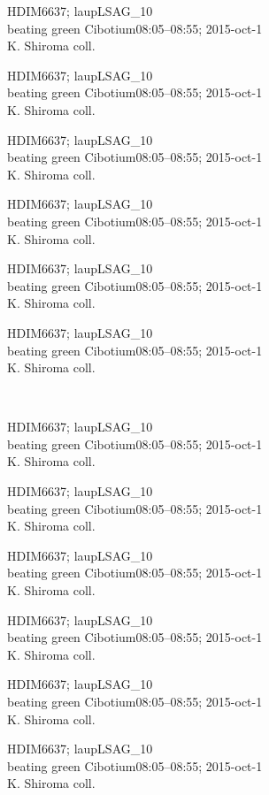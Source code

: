 \documentclass[2pt]{extarticle}
\begin{document}
\noindent
\parbox{0.16\textwidth}{\tiny \raggedright \rule[-0.3\baselineskip]{0pt}{10pt}HDIM6637; laupLSAG\_10\\ beating green Cibotium08:05--08:55; 2015-oct-1\\ K. Shiroma coll.}
\parbox{0.16\textwidth}{\tiny \raggedright \rule[-0.3\baselineskip]{0pt}{10pt}HDIM6637; laupLSAG\_10\\ beating green Cibotium08:05--08:55; 2015-oct-1\\ K. Shiroma coll.}
\parbox{0.16\textwidth}{\tiny \raggedright \rule[-0.3\baselineskip]{0pt}{10pt}HDIM6637; laupLSAG\_10\\ beating green Cibotium08:05--08:55; 2015-oct-1\\ K. Shiroma coll.}
\parbox{0.16\textwidth}{\tiny \raggedright \rule[-0.3\baselineskip]{0pt}{10pt}HDIM6637; laupLSAG\_10\\ beating green Cibotium08:05--08:55; 2015-oct-1\\ K. Shiroma coll.}
\parbox{0.16\textwidth}{\tiny \raggedright \rule[-0.3\baselineskip]{0pt}{10pt}HDIM6637; laupLSAG\_10\\ beating green Cibotium08:05--08:55; 2015-oct-1\\ K. Shiroma coll.}
\parbox{0.16\textwidth}{\tiny \raggedright \rule[-0.3\baselineskip]{0pt}{10pt}HDIM6637; laupLSAG\_10\\ beating green Cibotium08:05--08:55; 2015-oct-1\\ K. Shiroma coll.} \\ 
\vspace{0.001in} 

\noindent
\parbox{0.16\textwidth}{\tiny \raggedright \rule[-0.3\baselineskip]{0pt}{10pt}HDIM6637; laupLSAG\_10\\ beating green Cibotium08:05--08:55; 2015-oct-1\\ K. Shiroma coll.}
\parbox{0.16\textwidth}{\tiny \raggedright \rule[-0.3\baselineskip]{0pt}{10pt}HDIM6637; laupLSAG\_10\\ beating green Cibotium08:05--08:55; 2015-oct-1\\ K. Shiroma coll.}
\parbox{0.16\textwidth}{\tiny \raggedright \rule[-0.3\baselineskip]{0pt}{10pt}HDIM6637; laupLSAG\_10\\ beating green Cibotium08:05--08:55; 2015-oct-1\\ K. Shiroma coll.}
\parbox{0.16\textwidth}{\tiny \raggedright \rule[-0.3\baselineskip]{0pt}{10pt}HDIM6637; laupLSAG\_10\\ beating green Cibotium08:05--08:55; 2015-oct-1\\ K. Shiroma coll.}
\parbox{0.16\textwidth}{\tiny \raggedright \rule[-0.3\baselineskip]{0pt}{10pt}HDIM6637; laupLSAG\_10\\ beating green Cibotium08:05--08:55; 2015-oct-1\\ K. Shiroma coll.}
\parbox{0.16\textwidth}{\tiny \raggedright \rule[-0.3\baselineskip]{0pt}{10pt}HDIM6637; laupLSAG\_10\\ beating green Cibotium08:05--08:55; 2015-oct-1\\ K. Shiroma coll.} \\ 
\vspace{0.001in} 
\end{document}
